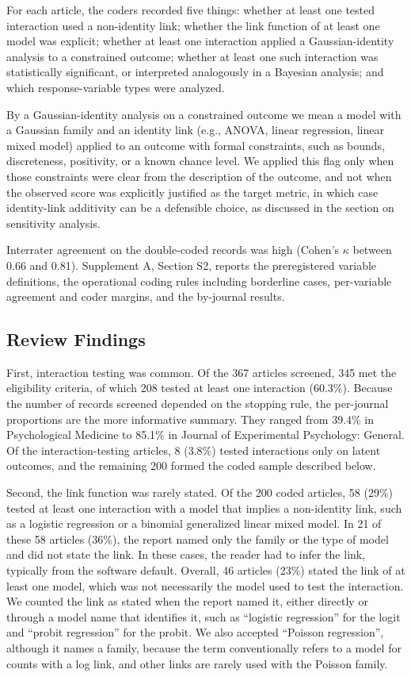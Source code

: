 \documentclass[
  man,
  floatsintext,
  longtable,
  nolmodern,
  notxfonts,
  notimes,
  colorlinks=true,linkcolor=blue,citecolor=blue,urlcolor=blue]{apa7}
\begin{document}
For each article, the coders recorded five things: whether at least one
tested interaction used a non-identity link; whether the link function
of at least one model was explicit; whether at least one interaction
applied a Gaussian-identity analysis to a constrained outcome; whether
at least one such interaction was statistically significant, or
interpreted analogously in a Bayesian analysis; and which
response-variable types were analyzed.

By a Gaussian-identity analysis on a constrained outcome we mean a model
with a Gaussian family and an identity link (e.g., ANOVA, linear
regression, linear mixed model) applied to an outcome with formal
constraints, such as bounds, discreteness, positivity, or a known chance
level. We applied this flag only when those constraints were clear from
the description of the outcome, and not when the observed score was
explicitly justified as the target metric, in which case identity-link
additivity can be a defensible choice, as discussed in the section on
sensitivity analysis.

Interrater agreement on the double-coded records was high (Cohen's
\(\kappa\) between 0.66 and 0.81). Supplement A, Section S2, reports the
preregistered variable definitions, the operational coding rules
including borderline cases, per-variable agreement and coder margins,
and the by-journal results.

\subsection{Review Findings}\label{review-findings}

First, interaction testing was common. Of the 367 articles screened, 345
met the eligibility criteria, of which 208 tested at least one
interaction (60.3\%). Because the number of records screened depended on
the stopping rule, the per-journal proportions are the more informative
summary. They ranged from 39.4\% in Psychological Medicine to 85.1\% in
Journal of Experimental Psychology: General. Of the interaction-testing
articles, 8 (3.8\%) tested interactions only on latent outcomes, and the
remaining 200 formed the coded sample described below.

Second, the link function was rarely stated. Of the 200 coded articles,
58 (29\%) tested at least one interaction with a model that implies a
non-identity link, such as a logistic regression or a binomial
generalized linear mixed model. In 21 of these 58 articles (36\%), the
report named only the family or the type of model and did not state the
link. In these cases, the reader had to infer the link, typically from
the software default. Overall, 46 articles (23\%) stated the link of at
least one model, which was not necessarily the model used to test the
interaction. We counted the link as stated when the report named it,
either directly or through a model name that identifies it, such as
``logistic regression'' for the logit and ``probit regression'' for the
probit. We also accepted ``Poisson regression'', although it names a
family, because the term conventionally refers to a model for counts
with a log link, and other links are rarely used with the Poisson
family.
\end{document}
